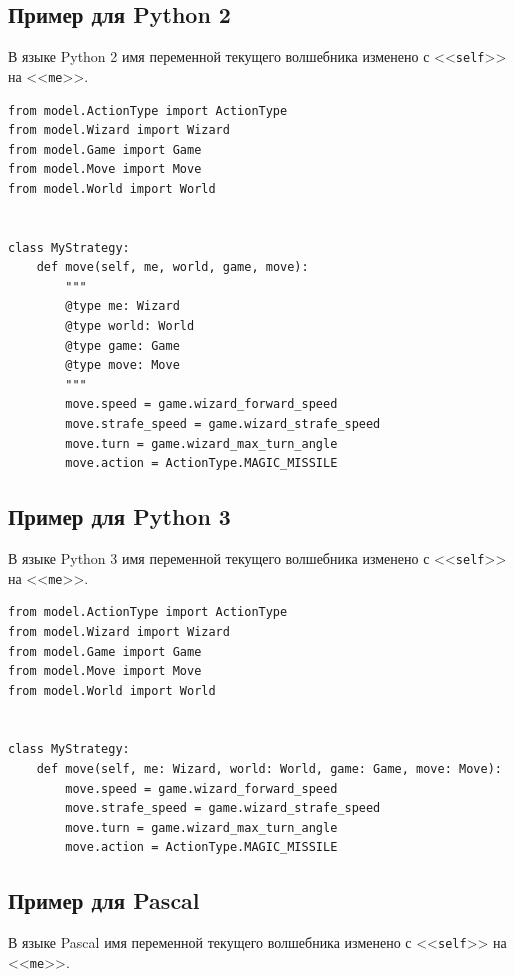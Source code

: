 \newpage
\subsection{Пример для Python 2}

В языке Python 2 имя переменной текущего волшебника изменено с <<\texttt{self}>> на <<\texttt{me}>>.

\begin{verbatim}
from model.ActionType import ActionType
from model.Wizard import Wizard
from model.Game import Game
from model.Move import Move
from model.World import World


class MyStrategy:
    def move(self, me, world, game, move):
        """
        @type me: Wizard
        @type world: World
        @type game: Game
        @type move: Move
        """
        move.speed = game.wizard_forward_speed
        move.strafe_speed = game.wizard_strafe_speed
        move.turn = game.wizard_max_turn_angle
        move.action = ActionType.MAGIC_MISSILE
\end{verbatim}

\subsection{Пример для Python 3}

В языке Python 3 имя переменной текущего волшебника изменено с <<\texttt{self}>> на <<\texttt{me}>>.

\begin{verbatim}
from model.ActionType import ActionType
from model.Wizard import Wizard
from model.Game import Game
from model.Move import Move
from model.World import World


class MyStrategy:
    def move(self, me: Wizard, world: World, game: Game, move: Move):
        move.speed = game.wizard_forward_speed
        move.strafe_speed = game.wizard_strafe_speed
        move.turn = game.wizard_max_turn_angle
        move.action = ActionType.MAGIC_MISSILE
\end{verbatim}

\newpage
\subsection{Пример для Pascal}

В языке Pascal имя переменной текущего волшебника изменено с <<\texttt{self}>> на <<\texttt{me}>>.


